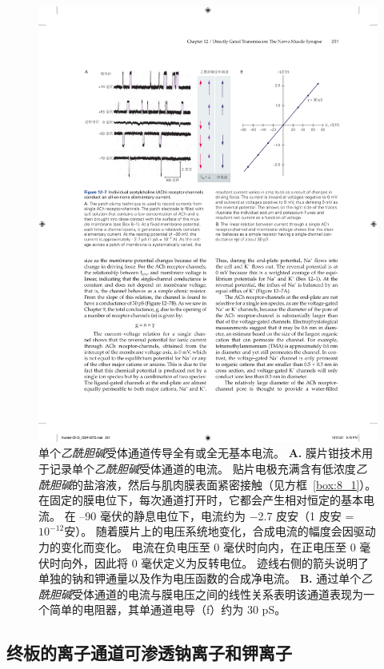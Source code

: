 \begin{figure}[htbp]
	\centering
	\includegraphics[width=1.0\linewidth]{chap12/fig_12_7}
	\caption{单个\textit{乙酰胆碱}受体通道传导全有或全无基本电流。
		\textbf{A.} 膜片钳技术用于记录单个\textit{乙酰胆碱}受体通道的电流。
		贴片电极充满含有低浓度\textit{乙酰胆碱}的盐溶液，然后与肌肉膜表面紧密接触（见方框~\ref{box:8_1}）。
		在固定的膜电位下，每次通道打开时，它都会产生相对恒定的基本电流。
		在 –90 毫伏的静息电位下，电流约为 −2.7 皮安（1 皮安 = $10^{-12}$安）。
		随着膜片上的电压系统地变化，合成电流的幅度会因驱动力的变化而变化。
		电流在负电压至 0 毫伏时向内，在正电压至 0 毫伏时向外，因此将 0 毫伏定义为反转电位。
		迹线右侧的箭头说明了单独的钠和钾通量以及作为电压函数的合成净电流。
		\textbf{B.} 通过单个\textit{乙酰胆碱}受体通道的电流与膜电压之间的线性关系表明该通道表现为一个简单的电阻器，其单通道电导（f）约为 30 pS。}
	\label{fig:12_7}
\end{figure}



\subsection{终板的离子通道可渗透钠离子和钾离子}

